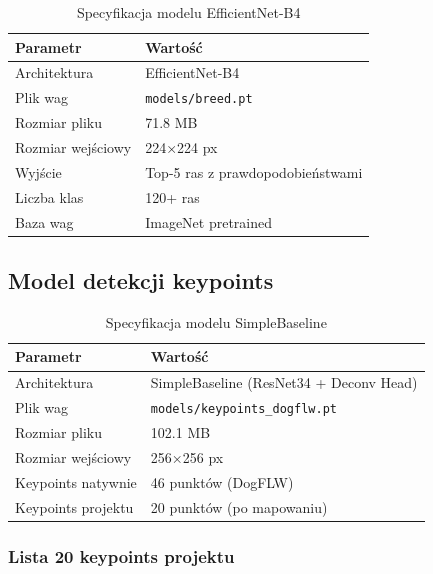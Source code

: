 \documentclass[12pt,a4paper]{article}
\begin{document}
\begin{table}[H]
\centering
\caption{Specyfikacja modelu EfficientNet-B4}
\begin{tabular}{|l|l|}
\hline
\textbf{Parametr} & \textbf{Wartość} \\
\hline
Architektura & EfficientNet-B4 \\
Plik wag & \texttt{models/breed.pt} \\
Rozmiar pliku & 71.8 MB \\
Rozmiar wejściowy & 224×224 px \\
Wyjście & Top-5 ras z prawdopodobieństwami \\
Liczba klas & 120+ ras \\
Baza wag & ImageNet pretrained \\
\hline
\end{tabular}
\end{table}

\subsection{Model detekcji keypoints}

\begin{table}[H]
\centering
\caption{Specyfikacja modelu SimpleBaseline}
\begin{tabular}{|l|l|}
\hline
\textbf{Parametr} & \textbf{Wartość} \\
\hline
Architektura & SimpleBaseline (ResNet34 + Deconv Head) \\
Plik wag & \texttt{models/keypoints\_dogflw.pt} \\
Rozmiar pliku & 102.1 MB \\
Rozmiar wejściowy & 256×256 px \\
Keypoints natywnie & 46 punktów (DogFLW) \\
Keypoints projektu & 20 punktów (po mapowaniu) \\
\hline
\end{tabular}
\end{table}

\subsubsection{Lista 20 keypoints projektu}
\end{document}
